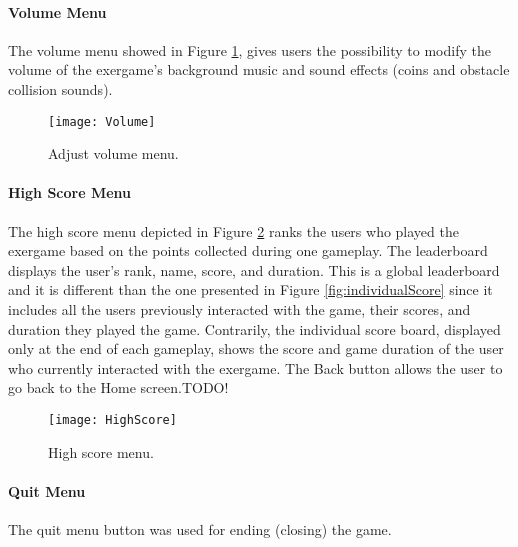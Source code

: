 \paragraph{Volume Menu}
The volume menu showed in Figure \ref{fig:volume}, gives users the possibility to modify the volume of the exergame's background music and sound effects (coins and obstacle collision sounds).\\
\begin{figure}[h]
    \centering
    \texttt{[image: Volume]}
    \caption{Adjust volume menu.}
    \label{fig:volume}
\end{figure}
\paragraph{High Score Menu}
The high score menu depicted in Figure \ref{fig:highscore} ranks the users who played the exergame based on the points collected during one gameplay. The leaderboard displays the user's rank, name, score, and duration. This is a global leaderboard and it is different than the one presented in Figure \ref{fig:individualScore} since it includes all the users previously interacted with the game, their scores, and duration they played the game. Contrarily, the individual score board, displayed only at the end of each gameplay, shows the score and game duration of the user who currently interacted with the exergame. The Back button allows the user to go back to the Home screen.TODO!
\begin{figure}[h]
    \centering
    \texttt{[image: HighScore]}
    \caption{High score menu.}
    \label{fig:highscore}
\end{figure}
\paragraph{Quit Menu}
The quit menu button was used for ending (closing) the game. 
